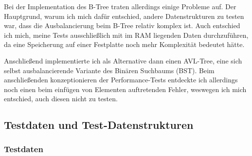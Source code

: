 \documentclass[11pt,a4paper]{article}
\begin{document}
\begin{center}
\end{center}

Bei der Implementation des B-Tree traten allerdings einige Probleme auf.
Der Hauptgrund, warum ich mich dafür entschied, andere Datenstrukturen
zu testen war, dass die Ausbalancierung beim B-Tree relativ komplex ist.
Auch entschied ich mich, meine Tests ausschließlich mit im RAM liegenden Daten
durchzuführen, da eine Speicherung auf einer Festplatte noch mehr Komplexität bedeutet
hätte.

\vspace*{0.5cm}

Anschließend implementierte ich als Alternative dann einen AVL-Tree, eine sich selbst
ausbalancierende Variante des Binären Suchbaums (BST). Beim anschließenden
konzeptionieren der Performance-Tests entdeckte ich allerdings noch einen
beim einfügen von Elementen auftretenden Fehler, weswegen ich mich entschied,
auch diesen nicht zu testen.

\clearpage

\subsection{Testdaten und Test-Datenstrukturen}

\subsubsection{Testdaten}
\end{document}
